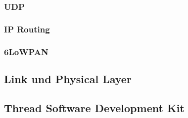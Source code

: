 \subsubsection{UDP}\label{subsubsec:UDP}
\subsubsection{IP Routing}\label{subsubsec:IPRouting}
\subsubsection{6LoWPAN}\label{subsubsec:6LoWPAN}

\subsection{Link und Physical Layer}\label{subsec:IEE802154}

\subsection{Thread Software Development Kit}\label{subsec:ThreadSoftwareDevelopmentKit}
